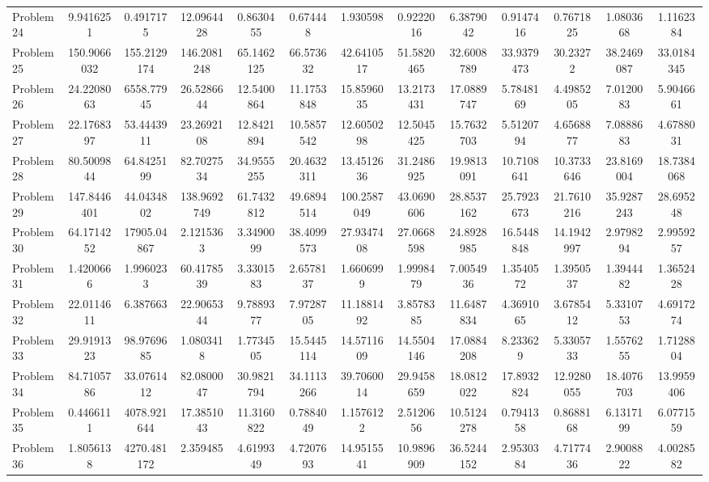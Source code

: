 \documentclass[amsmath, amssymb, aps]{revtex4-2}
\begin{document}
\begin{table}[H]
{\begin{tabular}{lcccccccccccc}
Problem 24 & 9.9416251 & 0.4917175 & 12.0964428 & 0.8630455 & 0.674448 & 1.930598 & 0.9222016 & 6.3879042 & 0.9147416 & 0.7671825 & 1.0803668 & 1.1162384 \\
Problem 25 & 150.9066032 & 155.2129174 & 146.2081248 & 65.1462125 & 66.573632 & 42.6410517 & 51.5820465 & 32.6008789 & 33.9379473 & 30.23272 & 38.2469087 & 33.0184345 \\
Problem 26 & 24.2208063 & 6558.77945 & 26.5286644 & 12.5400864 & 11.1753848 & 15.8596035 & 13.2173431 & 17.0889747 & 5.7848169 & 4.4985205 & 7.0120083 & 5.9046661 \\
Problem 27 & 22.1768397 & 53.4443911 & 23.2692108 & 12.8421894 & 10.5857542 & 12.6050298 & 12.5045425 & 15.7632703 & 5.5120794 & 4.6568877 & 7.0888683 & 4.6788031 \\
Problem 28 & 80.5009844 & 64.8425199 & 82.7027534 & 34.9555255 & 20.4632311 & 13.4512636 & 31.2486925 & 19.9813091 & 10.7108641 & 10.3733646 & 23.8169004 & 18.7384068 \\
Problem 29 & 147.8446401 & 44.0434802 & 138.9692749 & 61.7432812 & 49.6894514 & 100.2587049 & 43.0690606 & 28.8537162 & 25.7923673 & 21.7610216 & 35.9287243 & 28.695248 \\
Problem 30 & 64.1714252 & 17905.04867 & 2.1215363 & 3.3490099 & 38.4099573 & 27.9347408 & 27.0668598 & 24.8928985 & 16.5448848 & 14.1942997 & 2.9798294 & 2.9959257 \\
Problem 31 & 1.4200666 & 1.9960233 & 60.4178539 & 3.3301583 & 2.6578137 & 1.6606999 & 1.9998479 & 7.0054936 & 1.3540572 & 1.3950537 & 1.3944482 & 1.3652428 \\
Problem 32 & 22.0114611 & 6.387663 & 22.9065344 & 9.7889377 & 7.9728705 & 11.1881492 & 3.8578385 & 11.6487834 & 4.3691065 & 3.6785412 & 5.3310753 & 4.6917274 \\
Problem 33 & 29.9191323 & 98.9769685 & 1.0803418 & 1.7734505 & 15.5445114 & 14.5711609 & 14.5504146 & 17.0884208 & 8.233629 & 5.3305733 & 1.5576255 & 1.7128804 \\
Problem 34 & 84.7105786 & 33.0761412 & 82.0800047 & 30.9821794 & 34.1113266 & 39.7060014 & 29.9458659 & 18.0812022 & 17.8932824 & 12.9280055 & 18.4076703 & 13.9959406 \\
Problem 35 & 0.4466111 & 4078.921644 & 17.3851043 & 11.3160822 & 0.7884049 & 1.1576122 & 2.5120656 & 10.5124278 & 0.7941358 & 0.8688168 & 6.1317199 & 6.0771559 \\
Problem 36 & 1.8056138 & 4270.481172 & 2.359485 & 4.6199349 & 4.7207693 & 14.9515541 & 10.9896909 & 36.5244152 & 2.9530384 & 4.7177436 & 2.9008822 & 4.0028582 \\

\end{tabular}}
\end{table}
\end{document}
